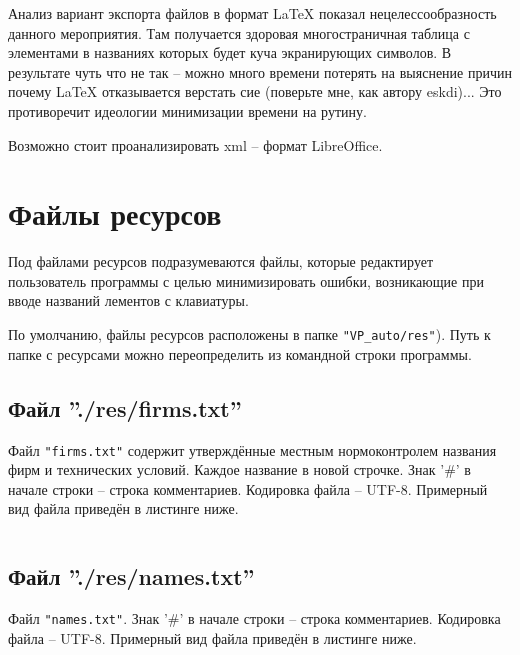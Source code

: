 Анализ вариант экспорта файлов в формат LaTeX показал нецелессообразность данного мероприятия. Там получается здоровая многостраничная таблица с элементами в названиях которых будет куча экранирующих символов. В результате чуть что не так -- можно много времени потерять на выяснение причин почему LaTeX отказывается верстать сие (поверьте мне, как автору eskdi)... Это противоречит идеологии минимизации времени на рутину.

Возможно стоит проанализировать xml -- формат LibreOffice.



\section{Файлы ресурсов}

Под файлами ресурсов подразумеваются файлы, которые редактирует пользователь программы с целью минимизировать ошибки, возникающие при вводе названий лементов с клавиатуры.

По умолчанию, файлы ресурсов расположены в папке \verb|"VP_auto/res"|). Путь к папке с ресурсами можно переопределить из командной строки программы.



\subsection{Файл ''./res/firms.txt''}
Файл \verb|"firms.txt"| содержит утверждённые местным нормоконтролем названия фирм и технических условий. Каждое название в новой строчке. Знак '\#' в начале строки -- строка комментариев. Кодировка файла -- UTF-8. Примерный вид файла приведён в листинге ниже.

\inputminted[fontsize=\small, linenos, breaklines, numbersep=2mm, xleftmargin=5mm, frame=single]{bash}{./VP_auto/inc/firms.txt}




\subsection{Файл ''./res/names.txt''}
Файл \verb|"names.txt"|. Знак '\#' в начале строки -- строка комментариев. Кодировка файла -- UTF-8. Примерный вид файла приведён в листинге ниже.

\inputminted[fontsize=\footnotesize, linenos, breaklines, numbersep=2mm, xleftmargin=5mm, frame=single]{bash}{./VP_auto/inc/names.txt}



